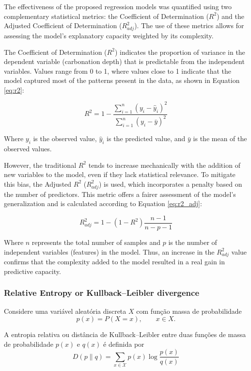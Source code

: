 The effectiveness of the proposed regression models was quantified using two complementary statistical metrics: the Coefficient of Determination ($R^2$) and the Adjusted Coefficient of Determination ($R^2_{adj}$). The use of these metrics allows for assessing the model's explanatory capacity weighted by its complexity.

The Coefficient of Determination ($R^2$) indicates the proportion of variance in the dependent variable (carbonation depth) that is predictable from the independent variables. Values range from 0 to 1, where values close to 1 indicate that the model captured most of the patterns present in the data, as shown in Equation \ref{eq:r2}:

\begin{equation}
    R^2 = 1 - \frac{\sum_{i=1}^{n} (y_i - \hat{y}_i)^2}{\sum_{i=1}^{n} (y_i - \bar{y})^2}
    \label{eq:r2}
\end{equation}

Where $y_i$ is the observed value, $\hat{y}_i$ is the predicted value, and $\bar{y}$ is the mean of the observed values.

However, the traditional $R^2$ tends to increase mechanically with the addition of new variables to the model, even if they lack statistical relevance. To mitigate this bias, the Adjusted $R^2$ ($R^2_{adj}$) is used, which incorporates a penalty based on the number of predictors. This metric offers a fairer assessment of the model's generalization and is calculated according to Equation \ref{eq:r2_adj}:

\begin{equation}
    R^2_{adj} = 1 - (1 - R^2) \frac{n - 1}{n - p - 1}
    \label{eq:r2_adj}
\end{equation}

Where $n$ represents the total number of samples and $p$ is the number of independent variables (features) in the model. Thus, an increase in the $R^2_{adj}$ value confirms that the complexity added to the model resulted in a real gain in predictive capacity.

\subsubsection{Relative Entropy or Kullback–Leibler divergence}

Considere uma variável aleatória discreta $X$   com função massa de probabilidade
\[
p(x)=P(X=x), \qquad x \in X.
\]

A entropia relativa ou distância de Kullback--Leibler entre duas
funções de massa de probabilidade $p(x)$ e $q(x)$ é definida por \cite{cover2006elements}
\begin{equation}
D(p\|q)
=
\sum_{x \in \mathcal{X}} p(x)
\log \frac{p(x)}{q(x)}
\label{eq:kl_discreta}
\end{equation}


